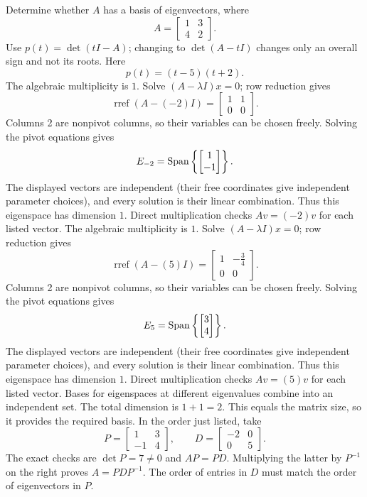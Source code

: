 \goal Determine whether $A$ has a basis of eigenvectors, where
\[A=\begin{bmatrix}1&3\\4&2\end{bmatrix}.\]
Use $p(t)=\det(tI-A)$; changing to $\det(A-tI)$ changes only an overall sign and not its roots. Here
\[p(t)=\left(t - 5\right) \left(t + 2\right).\]
The algebraic multiplicity is $1$. Solve $(A-\lambda I)x=0$; row reduction gives
\[\operatorname{rref}(A-(-2)I)=\begin{bmatrix}1&1\\0&0\end{bmatrix}.\]
Columns 2 are nonpivot columns, so their variables can be chosen freely. Solving the pivot equations gives
\[E_{-2}=\operatorname{Span}\left\{\begin{bmatrix}1\\-1\end{bmatrix}\right\}.\]
The displayed vectors are independent (their free coordinates give independent parameter choices), and every solution is their linear combination. Thus this eigenspace has dimension $1$. Direct multiplication checks $Av=(-2)v$ for each listed vector.
The algebraic multiplicity is $1$. Solve $(A-\lambda I)x=0$; row reduction gives
\[\operatorname{rref}(A-(5)I)=\begin{bmatrix}1&- \frac{3}{4}\\0&0\end{bmatrix}.\]
Columns 2 are nonpivot columns, so their variables can be chosen freely. Solving the pivot equations gives
\[E_{5}=\operatorname{Span}\left\{\begin{bmatrix}3\\4\end{bmatrix}\right\}.\]
The displayed vectors are independent (their free coordinates give independent parameter choices), and every solution is their linear combination. Thus this eigenspace has dimension $1$. Direct multiplication checks $Av=(5)v$ for each listed vector.
Bases for eigenspaces at different eigenvalues combine into an independent set. The total dimension is $1+1=2$.
This equals the matrix size, so it provides the required basis. In the order just listed, take
\[P=\begin{bmatrix}1&3\\-1&4\end{bmatrix},\qquad D=\begin{bmatrix}-2&0\\0&5\end{bmatrix}.\]
The exact checks are $\det P=7\ne0$ and $AP=PD$. Multiplying the latter by $P^{-1}$ on the right proves $A=PDP^{-1}$. The order of entries in $D$ must match the order of eigenvectors in $P$.



